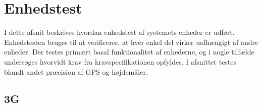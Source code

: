 \chapter{Enhedstest}
I dette afsnit beskrives hvordan enhedstest af systemets enheder er udført. Enhedstesten bruges til at verificerer, at hver enkel del virker uafhængigt af andre enheder. 
Der testes primært basal funktionalitet af enhederne, og i nogle tilfælde undersøges hvorvidt krav fra kravspecifikationen opfyldes. I afsnittet testes blandt andet præcision af GPS og højdemåler.

\section{3G}

\newpage


\newpage


\newpage 

